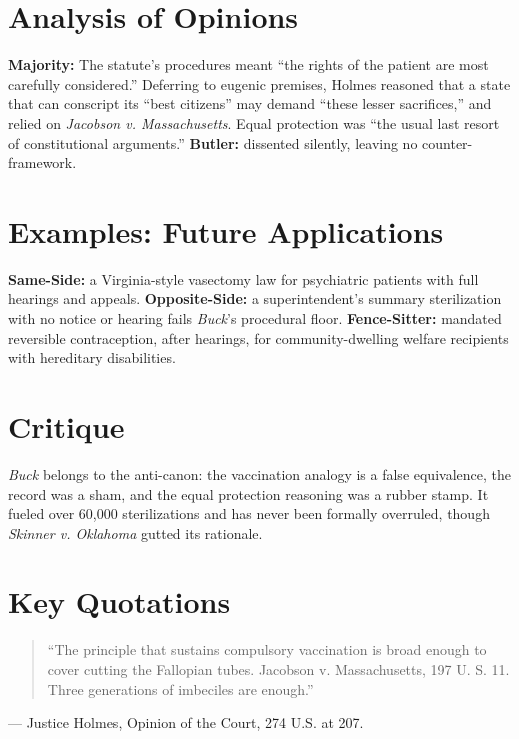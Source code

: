 \documentclass[12pt]{article}
\begin{document}
\section{Analysis of Opinions}
\textbf{Majority:} The statute's procedures meant ``the rights of the patient are most carefully considered.'' Deferring to eugenic premises, Holmes reasoned that a state that can conscript its ``best citizens'' may demand ``these lesser sacrifices,'' and relied on \textit{Jacobson v. Massachusetts}. Equal protection was ``the usual last resort of constitutional arguments.'' \textbf{Butler:} dissented silently, leaving no counter-framework.

\section{Examples: Future Applications}
\textbf{Same-Side:} a Virginia-style vasectomy law for psychiatric patients with full hearings and appeals. \textbf{Opposite-Side:} a superintendent's summary sterilization with no notice or hearing fails \textit{Buck}'s procedural floor. \textbf{Fence-Sitter:} mandated reversible contraception, after hearings, for community-dwelling welfare recipients with hereditary disabilities.

\section{Critique}
\textit{Buck} belongs to the anti-canon: the vaccination analogy is a false equivalence, the record was a sham, and the equal protection reasoning was a rubber stamp. It fueled over 60,000 sterilizations and has never been formally overruled, though \textit{Skinner v. Oklahoma} gutted its rationale.

\section{Key Quotations}
\begin{quote}
``The principle that sustains compulsory vaccination is broad enough to cover cutting the Fallopian tubes. Jacobson v. Massachusetts, 197 U. S. 11. Three generations of imbeciles are enough.''
\end{quote}
\noindent --- Justice Holmes, Opinion of the Court, 274 U.S. at 207.
\end{document}
